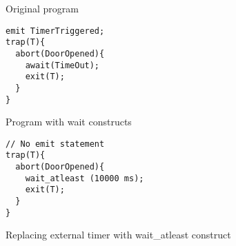 \begin{figure}[h!]
	\vspace{-10pt}
	\centering
  \begin{SubFloat}{\label{delaycode:a}Original program}
      \scriptsize
		\begin{lstlisting}[style=sysj,morekeywords={abort,await,emit,present,trap,pause,exit,suspend}]
emit TimerTriggered;
trap(T){
  abort(DoorOpened){
    await(TimeOut);
    exit(T); 
  }
}
\end{lstlisting}
  \end{SubFloat}
  \hspace{1cm}%
  \begin{SubFloat}{\label{delaycode:b}Program with wait constructs}
		\begin{lstlisting}[style=sysj,morekeywords={abort,await,emit,present,trap,pause,exit,wait_atleast,suspend}]
// No emit statement
trap(T){
  abort(DoorOpened){
    wait_atleast (10000 ms);
    exit(T);  
  }
}
\end{lstlisting}
	\end{SubFloat}
\caption{Replacing external timer with wait\_atleast construct}
\label{delaycode}
\end{figure}









